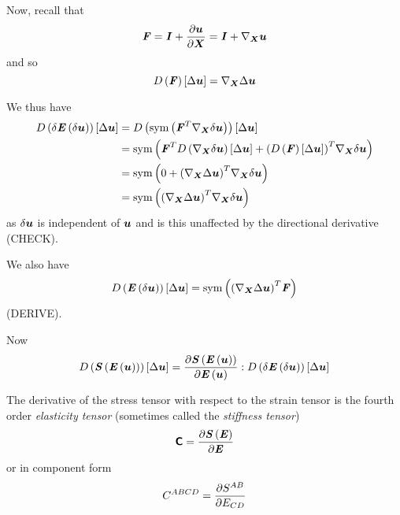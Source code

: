 Now, recall that
\begin{equation}
  \tensortwo{F}=\tensortwo{I}+\delby{\vectr{u}}{\vectr{X}}=\tensortwo{I}+\gradient{\vectr{X}}{\vectr{u}}
\end{equation}
and so
\begin{equation}
  \directionalderiv{\tensortwo{F}}{\Delta\vectr{u}}=\gradient{\vectr{X}}{\Delta\vectr{u}}
\end{equation}

We thus have
\begin{equation}
  \begin{split}
    \directionalderiv{\delta\fnof{\tensortwo{E}}{\delta\vectr{u}}}{\Delta\vectr{u}}&=
    \directionalderiv{\sympart\pbrac{\transpose{\tensortwo{F}}\gradient{\vectr{X}}{\delta\vectr{u}}}}{\Delta\vectr{u}}\\
    &=\sympart\pbrac{\transpose{\tensortwo{F}}\directionalderiv{\gradient{\vectr{X}}{\delta\vectr{u}}}{\Delta\vectr{u}}+
      \transpose{\pbrac{\directionalderiv{\tensortwo{F}}{\Delta\vectr{u}}}}\gradient{\vectr{X}}{\delta\vectr{u}}}\\
    &=\sympart\pbrac{0+\transpose{\pbrac{\gradient{\vectr{X}}{\Delta\vectr{u}}}}\gradient{\vectr{X}}{\delta\vectr{u}}}\\
    &=\sympart\pbrac{\transpose{\pbrac{\gradient{\vectr{X}}{\Delta\vectr{u}}}}\gradient{\vectr{X}}{\delta\vectr{u}}}
  \end{split}
\end{equation}
as $\delta\boldsymbol{u}$ is independent of $\boldsymbol{u}$ and is this unaffected by
the directional derivative (CHECK).

We also have
\begin{equation}
  \directionalderiv{\fnof{\tensortwo{E}}{\delta\vectr{u}}}{\Delta\vectr{u}}=
  \sympart\pbrac{\transpose{\pbrac{\gradient{\vectr{X}}{\Delta\vectr{u}}}}\tensortwo{F}}
\end{equation}
(DERIVE).

Now
\begin{equation}
     D\left(  \boldsymbol{\mathit{S}}\left(  \boldsymbol{\mathit{E}}\left( \boldsymbol{u} \right)  \right)  \right) \left[ \Delta\boldsymbol{u} \right]  =
   \dfrac{\partial  \boldsymbol{\mathit{S}}\left(  \boldsymbol{\mathit{E}}\left( \boldsymbol{u} \right)  \right) }{\partial  \boldsymbol{\mathit{E}}\left( \boldsymbol{u} \right) } :
       D\left( \delta \boldsymbol{\mathit{E}}\left( \delta\boldsymbol{u} \right)  \right) \left[ \Delta\boldsymbol{u} \right]  
\end{equation}

The derivative of the stress tensor with respect to the strain tensor is the
fourth order \emph{elasticity tensor} (sometimes called the \emph{stiffness
  tensor}) \ie
\begin{equation}
  \boldsymbol{\mathsf{C}}= \dfrac{\partial  \boldsymbol{\mathit{S}}\left( \boldsymbol{\mathit{E}} \right) }{\partial \boldsymbol{\mathit{E}}} 
\end{equation}
or in component form
\begin{equation}
  C^{ABCD}= \dfrac{\partial S^{AB}}{\partial E_{CD}} 
\end{equation}

